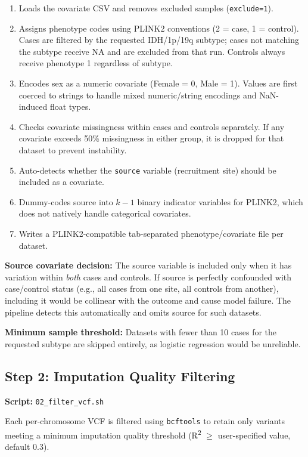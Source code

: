 \documentclass[11pt,letterpaper]{article}
\begin{document}
\begin{enumerate}[nosep]
    \item Loads the covariate CSV and removes excluded samples (\texttt{exclude=1}).
    \item Assigns phenotype codes using PLINK2 conventions (2 = case, 1 = control). Cases are filtered by the requested IDH/1p/19q subtype; cases not matching the subtype receive NA and are excluded from that run. Controls always receive phenotype 1 regardless of subtype.
    \item Encodes sex as a numeric covariate (Female = 0, Male = 1). Values are first coerced to strings to handle mixed numeric/string encodings and NaN-induced float types.
    \item Checks covariate missingness within cases and controls separately. If any covariate exceeds 50\% missingness in either group, it is dropped for that dataset to prevent instability.
    \item Auto-detects whether the \texttt{source} variable (recruitment site) should be included as a covariate.
    \item Dummy-codes source into $k - 1$ binary indicator variables for PLINK2, which does not natively handle categorical covariates.
    \item Writes a PLINK2-compatible tab-separated phenotype/covariate file per dataset.
\end{enumerate}

\textbf{Source covariate decision:} The source variable is included only when it has variation within \emph{both} cases and controls. If source is perfectly confounded with case/control status (e.g., all cases from one site, all controls from another), including it would be collinear with the outcome and cause model failure. The pipeline detects this automatically and omits source for such datasets.

\textbf{Minimum sample threshold:} Datasets with fewer than 10 cases for the requested subtype are skipped entirely, as logistic regression would be unreliable.

\subsection[Step 2: Imputation Quality Filtering]{Step 2: Imputation Quality Filtering}
\label{sec:step2}

\textbf{Script:} \texttt{02\_filter\_vcf.sh}

Each per-chromosome VCF is filtered using \texttt{bcftools} to retain only variants meeting a minimum imputation quality threshold (R\textsuperscript{2} $\geq$ user-specified value, default 0.3).
\end{document}
